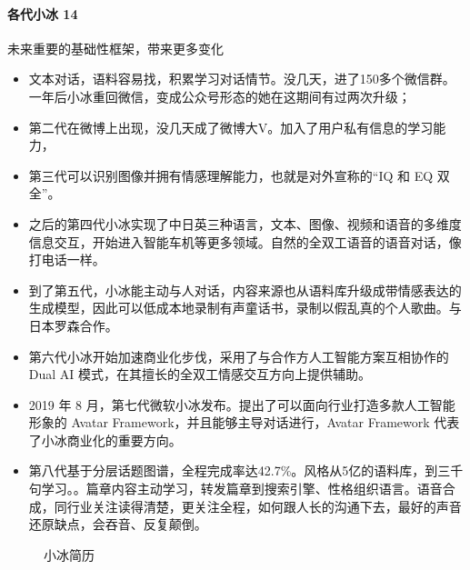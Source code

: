 \documentclass[letterpaper,11pt,english]{sphinxmanual}
\begin{document}
\paragraph{各代小冰 14\sphinxfootnotemark[938]}
\label{\detokenize{chapter_company/xiaoice:id9}}%
\begin{footnotetext}[938]\sphinxAtStartFootnote
{}
%
\end{footnotetext}\ignorespaces 
未来重要的基础性框架，带来更多变化
\begin{itemize}
\item {} 
文本对话，语料容易找，积累学习对话情节。没几天，进了150多个微信群。一年后小冰重回微信，变成公众号形态的她在这期间有过两次升级；

\item {} 
第二代在微博上出现，没几天成了微博大V。加入了用户私有信息的学习能力，

\item {} 
第三代可以识别图像并拥有情感理解能力，也就是对外宣称的“IQ 和 EQ
双全”。

\item {} 
之后的第四代小冰实现了中日英三种语言，文本、图像、视频和语音的多维度信息交互，开始进入智能车机等更多领域。自然的全双工语音的语音对话，像打电话一样。

\item {} 
到了第五代，小冰能主动与人对话，内容来源也从语料库升级成带情感表达的生成模型，因此可以低成本地录制有声童话书，录制以假乱真的个人歌曲。与日本罗森合作。

\item {} 
第六代小冰开始加速商业化步伐，采用了与合作方人工智能方案互相协作的
Dual AI 模式，在其擅长的全双工情感交互方向上提供辅助。

\item {} 
2019 年 8
月，第七代微软小冰发布。提出了可以面向行业打造多款人工智能形象的
Avatar Framework，并且能够主导对话进行，Avatar Framework
代表了小冰商业化的重要方向。

\item {} 
第八代基于分层话题图谱，全程完成率达42.7\%。风格从5亿的语料库，到三千句学习。。篇章内容主动学习，转发篇章到搜索引擎、性格组织语言。语音合成，同行业关注读得清楚，更关注全程，如何跟人长的沟通下去，最好的声音还原缺点，会吞音、反复颠倒。

\end{itemize}

\begin{figure}[H]
\centering
\capstart

\noindent{}
\caption{小冰简历}\label{\detokenize{chapter_company/xiaoice:id24}}\end{figure}
\end{document}
